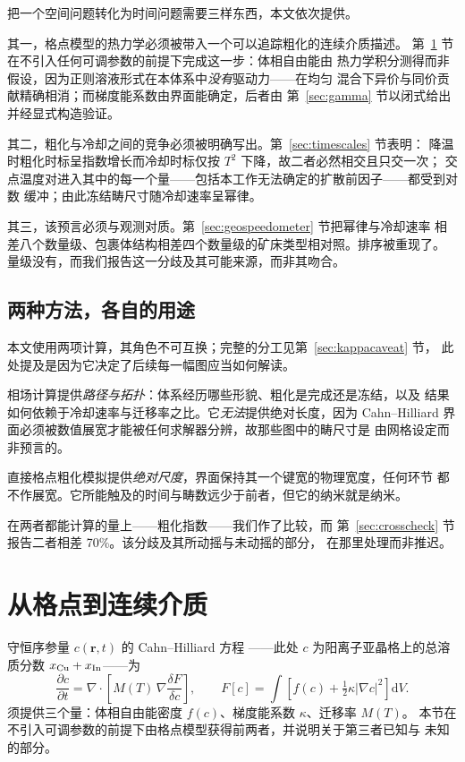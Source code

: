 \documentclass[11pt,a4paper]{ctexart}
\begin{document}
把一个空间问题转化为时间问题需要三样东西，本文依次提供。

其一，格点模型的热力学必须被带入一个可以追踪粗化的连续介质描述。
第~\ref{sec:bridge} 节在不引入任何可调参数的前提下完成这一步：体相自由能由
热力学积分测得而非假设，因为正则溶液形式在本体系中\emph{没有}驱动力——在均匀
混合下异价与同价贡献精确相消；而梯度能系数由界面能确定，后者由
第~\ref{sec:gamma} 节以闭式给出并经显式构造验证。

其二，粗化与冷却之间的竞争必须被明确写出。第~\ref{sec:timescales} 节表明：
降温时粗化时标呈指数增长而冷却时标仅按 $T^2$ 下降，故二者必然相交且只交一次；
交点温度对进入其中的每一个量——包括本工作无法确定的扩散前因子——都受到对数
缓冲；由此冻结畴尺寸随冷却速率呈幂律。

其三，该预言必须与观测对质。第~\ref{sec:geospeedometer} 节把幂律与冷却速率
相差八个数量级、包裹体结构相差四个数量级的矿床类型相对照。排序被重现了。
量级没有，而我们报告这一分歧及其可能来源，而非其吻合。

\subsection{两种方法，各自的用途}

本文使用两项计算，其角色不可互换；完整的分工见第~\ref{sec:kappacaveat} 节，
此处提及是因为它决定了后续每一幅图应当如何解读。

相场计算提供\emph{路径与拓扑}：体系经历哪些形貌、粗化是完成还是冻结，以及
结果如何依赖于冷却速率与迁移率之比。它\emph{无法}提供绝对长度，因为
Cahn--Hilliard 界面必须被数值展宽才能被任何求解器分辨，故那些图中的畴尺寸是
由网格设定而非预言的。

直接格点粗化模拟提供\emph{绝对尺度}，界面保持其一个键宽的物理宽度，任何环节
都不作展宽。它所能触及的时间与畴数远少于前者，但它的纳米就是纳米。

在两者都能计算的量上——粗化指数——我们作了比较，而
第~\ref{sec:crosscheck} 节报告二者相差 70\%。该分歧及其所动摇与未动摇的部分，
在那里处理而非推迟。

\section{从格点到连续介质}
\label{sec:bridge}

守恒序参量 $c(\mathbf{r}, t)$ 的 Cahn--Hilliard 方程 \citep{cahn1958}——此处
$c$ 为阳离子亚晶格上的总溶质分数 $x_{\rm Cu} + x_{\rm In}$——为
\begin{equation}
\frac{\partial c}{\partial t}
  = \nabla \cdot \left[ M(T)\, \nabla \frac{\delta F}{\delta c} \right],
\qquad
F[c] = \int \left[ f(c) + \tfrac{1}{2}\kappa \left|\nabla c\right|^2 \right] \mathrm{d}V .
\label{eq:ch}
\end{equation}
须提供三个量：体相自由能密度 $f(c)$、梯度能系数 $\kappa$、迁移率 $M(T)$。
本节在不引入可调参数的前提下由格点模型获得前两者，并说明关于第三者已知与
未知的部分。
\end{document}
